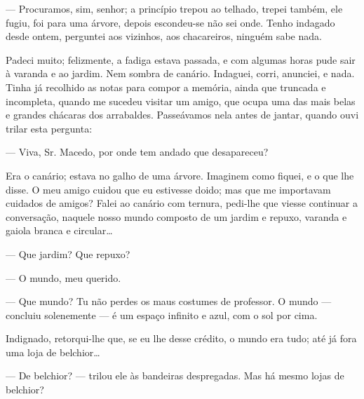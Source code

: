 --- Procuramos, sim, senhor; a princípio trepou ao telhado, trepei
também, ele fugiu, foi para uma árvore, depois escondeu-se não sei onde.
Tenho indagado desde ontem, perguntei aos vizinhos, aos chacareiros,
ninguém sabe nada.

Padeci muito; felizmente, a fadiga estava passada, e com algumas horas
pude sair à varanda e ao jardim. Nem sombra de canário. Indaguei, corri,
anunciei, e nada. Tinha já recolhido as notas para compor a memória,
ainda que truncada e incompleta, quando me sucedeu visitar um amigo, que
ocupa uma das mais belas e grandes chácaras dos arrabaldes. Passeávamos
nela antes de jantar, quando ouvi trilar esta pergunta:

--- Viva, Sr. Macedo, por onde tem andado que desapareceu?

Era o canário; estava no galho de uma árvore. Imaginem como fiquei, e o
que lhe disse. O meu amigo cuidou que eu estivesse doido; mas que me
importavam cuidados de amigos? Falei ao canário com ternura, pedi-lhe
que viesse continuar a conversação, naquele nosso mundo composto de um
jardim e repuxo, varanda e gaiola branca e circular\ldots{}

--- Que jardim? Que repuxo?

--- O mundo, meu querido.

--- Que mundo? Tu não perdes os maus costumes de professor. O mundo ---
concluiu solenemente --- é um espaço infinito e azul, com o sol por
cima.

Indignado, retorqui-lhe que, se eu lhe desse crédito, o mundo era tudo;
até já fora uma loja de belchior\ldots{}

--- De belchior? --- trilou ele às bandeiras despregadas. Mas há mesmo
lojas de belchior?


